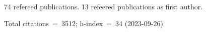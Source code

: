 74 refereed publications. 13 refeered publications as first author.

Total citations~=~3512; h-index~=~34 (2023-09-26)